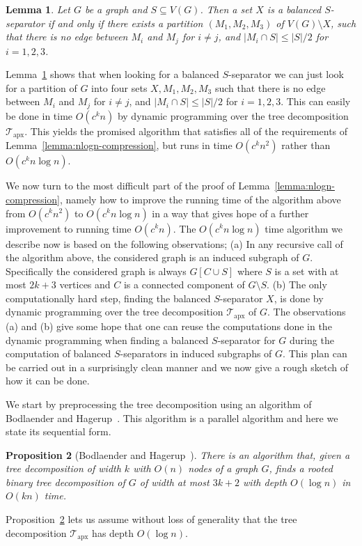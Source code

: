\documentclass[a4paper,11pt]{article}
\newtheorem{lemma}{Lemma}[section]
\newtheorem{proposition}[lemma]{Proposition}
\theoremstyle{definition}
\theoremstyle{remark}
\newcommand{\td}{\mathcal{T}} \newcommand{\tw}{\mathrm{tw}} \newcommand{\w}{\mathrm{w}}
\newcommand{\apx}{\textrm{apx}}
\begin{document}
\begin{lemma}\label{lem:balanced-3coloring}
  Let $G$ be a graph and $S\subseteq V(G)$.  Then a set $X$ is a balanced
  $S$-separator if and only if there exists a partition
  $(M_1,M_2,M_3)$ of $V(G)\setminus X$, such that there is no edge
  between $M_i$ and $M_j$ for $i\neq j$, and $|M_i\cap S|\leq |S|/2$
  for $i=1,2,3$.
\end{lemma}
Lemma~\ref{lem:balanced-3coloring} shows that when looking for a
balanced $S$-separator we can just look for a partition of $G$ into
four sets $X,M_1,M_2,M_3$ such that there is no edge between $M_i$ and
$M_j$ for $i\neq j$, and $|M_i\cap S|\leq |S|/2$ for $i=1,2,3$.  This
can easily be done in time $O(c^kn)$ by dynamic programming over the
tree decomposition $\td_\apx$.  This yields the promised algorithm
that satisfies all of the requirements of
Lemma~\ref{lemma:nlogn-compression}, but runs in time $O(c^kn^2)$
rather than $O(c^kn\log n)$.

\medskip We now turn to the most difficult part of the proof of
Lemma~\ref{lemma:nlogn-compression}, namely how to improve the running
time of the algorithm above from $O(c^kn^2)$ to $O(c^kn\log n)$ in a
way that gives hope of a further improvement to running time
$O(c^kn)$.  The $O(c^kn\log n)$ time algorithm we describe now is
based on the following observations; (a) In any recursive call of the
algorithm above, the considered graph is an induced subgraph of $G$.
Specifically the considered graph is always $G[C \cup S]$ where $S$ is
a set with at most $2k+3$ vertices and $C$ is a connected component of
$G \setminus S$.  (b) The only computationally hard step, finding the
balanced $S$-separator $X$, is done by dynamic programming over the
tree decomposition $\td_\apx$ of $G$.  The observations (a) and (b)
give some hope that one can reuse the computations done in the dynamic
programming when finding a balanced $S$-separator for $G$ during the
computation of balanced $S$-separators in induced subgraphs of $G$.
This plan can be carried out in a surprisingly clean manner and we now
give a rough sketch of how it can be done.

We start by preprocessing the tree decomposition using an algorithm of
Bodlaender and Hagerup~\cite{BodlaenderH98}.  This algorithm is a
parallel algorithm and here we state its sequential form.
\begin{proposition}[Bodlaender and Hagerup~\cite{BodlaenderH98}]
  \label{proposition:parallel}
  There is an algorithm that, given a tree decomposition of width $k$
  with $O(n)$ nodes of a graph $G$, finds a rooted binary tree
  decomposition of $G$ of width at most $3k+2$ with depth $O(\log n)$
  in $O(kn)$ time.
\end{proposition}
Proposition~\ref{proposition:parallel} lets us assume without loss of
generality that the tree decomposition $\td_\apx$ has depth $O(\log
n)$.
\end{document}
